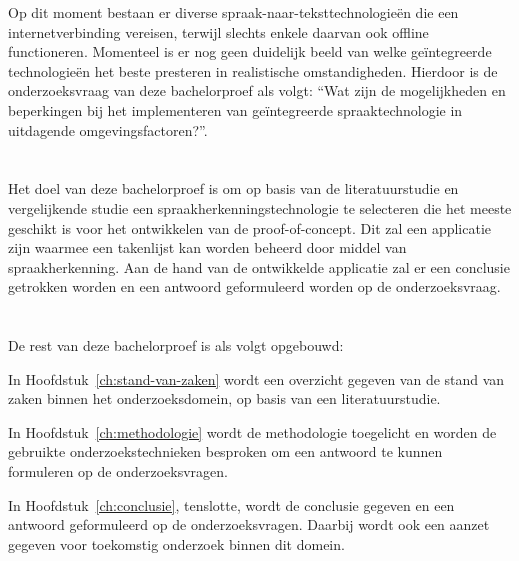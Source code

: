 Op dit moment bestaan er diverse spraak-naar-teksttechnologieën die een internetverbinding vereisen, terwijl slechts enkele daarvan ook offline functioneren. Momenteel is er nog geen duidelijk beeld van welke geïntegreerde technologieën het beste presteren in realistische omstandigheden. Hierdoor is de onderzoeksvraag van deze bachelorproef als volgt: ``Wat zijn de mogelijkheden en beperkingen bij het implementeren van geïntegreerde spraaktechnologie in uitdagende omgevingsfactoren?''.


\section{}%
\label{sec:onderzoeksdoelstelling}

Het doel van deze bachelorproef is om op basis van de literatuurstudie en vergelijkende studie een spraakherkenningstechnologie te selecteren die het meeste geschikt is voor het ontwikkelen van de proof-of-concept. Dit zal een applicatie zijn waarmee een takenlijst kan worden beheerd door middel van spraakherkenning. Aan de hand van de ontwikkelde applicatie zal er een conclusie getrokken worden en een antwoord geformuleerd worden op de onderzoeksvraag.


\section{}%
\label{sec:opzet-bachelorproef}


De rest van deze bachelorproef is als volgt opgebouwd:

In Hoofdstuk~\ref{ch:stand-van-zaken} wordt een overzicht gegeven van de stand van zaken binnen het onderzoeksdomein, op basis van een literatuurstudie.

In Hoofdstuk~\ref{ch:methodologie} wordt de methodologie toegelicht en worden de gebruikte onderzoekstechnieken besproken om een antwoord te kunnen formuleren op de onderzoeksvragen.


In Hoofdstuk~\ref{ch:conclusie}, tenslotte, wordt de conclusie gegeven en een antwoord geformuleerd op de onderzoeksvragen. Daarbij wordt ook een aanzet gegeven voor toekomstig onderzoek binnen dit domein.